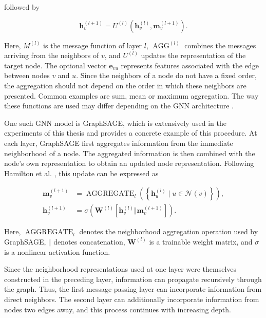 \documentclass[english]{lni}
\begin{document}
followed by

\begin{equation}
    \mathbf{h}_v^{(l+1)}
    =
    U^{(l)}
    \left(
        \mathbf{h}_v^{(l)},
        \mathbf{m}_v^{(l+1)}
    \right).
    \label{eq:message-update}
\end{equation}

Here, $M^{(l)}$ is the message function of layer $l$, $\operatorname{AGG}^{(l)}$ combines the messages arriving from the neighbors of $v$, and $U^{(l)}$ updates the representation of the target node. The optional vector $\mathbf{e}_{vu}$ represents features associated with the edge between nodes $v$ and $u$. Since the neighbors of a node do not have a fixed order, the aggregation should not depend on the order in which these neighbors are presented. Common examples are sum, mean or maximum aggregation. The way these functions are used may differ depending on the GNN architecture \cite{gilmer2017mpnn,hamilton2017graphsage}.

One such GNN model is GraphSAGE, which is extensively used in the experiments of this thesis and provides a concrete example of this procedure. At each layer, GraphSAGE first aggregates information from the immediate neighborhood of a node. The aggregated information is then combined with the node's own representation to obtain an updated node representation. Following Hamilton et al. \cite{hamilton2017graphsage}, this update can be expressed as

\begin{equation}
\begin{aligned}
\mathbf{m}_v^{(l+1)}
&= \operatorname{AGGREGATE}_{l}
\left(
\left\{\mathbf{h}_u^{(l)}
\mid u \in \mathcal{N}(v)\right\}
\right),\\
\mathbf{h}_v^{(l+1)}
&= \sigma\left(
\mathbf{W}^{(l)}
\left[
\mathbf{h}_v^{(l)}
\Vert \mathbf{m}_v^{(l+1)}
\right]
\right).
\end{aligned}
\label{eq:graphsage-update}
\end{equation}

Here, $\operatorname{AGGREGATE}_{l}$ denotes the neighborhood aggregation operation used by GraphSAGE, $\Vert$ denotes concatenation, $\mathbf{W}^{(l)}$ is a trainable weight matrix, and $\sigma$ is a nonlinear activation function.

Since the neighborhood representations used at one layer were themselves constructed in the preceding layer, information can propagate recursively through the graph. Thus, the first message-passing layer can incorporate information from direct neighbors. The second layer can additionally incorporate information from nodes two edges away, and this process continues with increasing depth.
\end{document}
